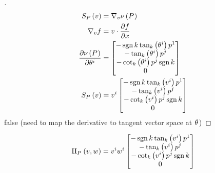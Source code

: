 \documentclass[stu, babel, american, biblatex, a4paper, leqno, draftall]{apa7}
\begin{document}
\begin{proof}[]
    \skipped

    \begin{align*}
        S_{P}\left(v\right)
                   & = \nabla_v \nu\left(\tensor{P}{}\right)     \\
        \nabla_v f & = v \cdot \frac{\partial f}{\partial x}     \\
        \frac{\partial\nu\left(\tensor{P}{}\right)}{\partial\tensor{\theta}{^i}}
                   & = \begin{bmatrix}
            -\sign{k}\tan_k\left(\tensor{\theta}{^i}\right)\tensor{p}{^1} \\
            -\tan_k\left(\tensor{\theta}{^i}\right)\tensor{p}{^j}         \\
            -\cot_k\left(\tensor{\theta}{^i}\right)\tensor{p}{^j}\sign{k} \\
            0                                                             \\
        \end{bmatrix}                \\
        S_{\tensor{P}{}}\left(v\right)
                   & = \tensor{v}{^i} \begin{bmatrix}
            -\sign{k}\tan_k\left(\tensor{v}{^i}\right)\tensor{p}{^1} \\
            -\tan_k\left(\tensor{v}{^i}\right)\tensor{p}{^j}         \\
            -\cot_k\left(\tensor{v}{^i}\right)\tensor{p}{^j}\sign{k} \\
            0                                                        \\
        \end{bmatrix}
    \end{align*}
    false (need to map the derivative to tangent vector space at $\tensor{\theta}{}$)
\end{proof}
\begin{lemma}\label{Model:SecondFundamental}
    \begin{equation*}
        \text{II}_{\tensor{P}{}}\left(v,w\right) = \tensor{v}{^i}\tensor{w}{^i} \begin{bmatrix}
            -\sign{k}\tan_k\left(\tensor{v}{^i}\right)\tensor{p}{^1} \\
            -\tan_k\left(\tensor{v}{^i}\right)\tensor{p}{^j}         \\
            -\cot_k\left(\tensor{v}{^i}\right)\tensor{p}{^j}\sign{k} \\
            0                                                        \\
        \end{bmatrix}
    \end{equation*}
\end{lemma}
\end{document}
